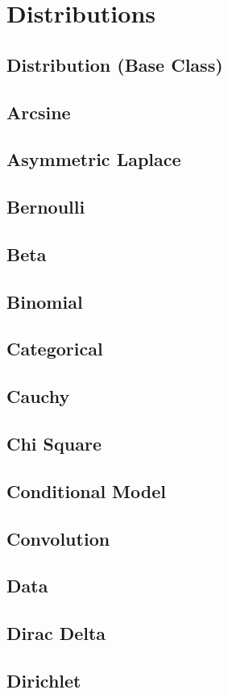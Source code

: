 \section{Distributions}
\subsection{Distribution (Base Class)}
\subsection{Arcsine}
\subsection{Asymmetric Laplace}
\subsection{Bernoulli}
\subsection{Beta}
\subsection{Binomial}
\subsection{Categorical}
\subsection{Cauchy}
\subsection{Chi Square}
\subsection{Conditional Model}
\subsection{Convolution}
\subsection{Data}
\subsection{Dirac Delta}
\subsection{Dirichlet}
